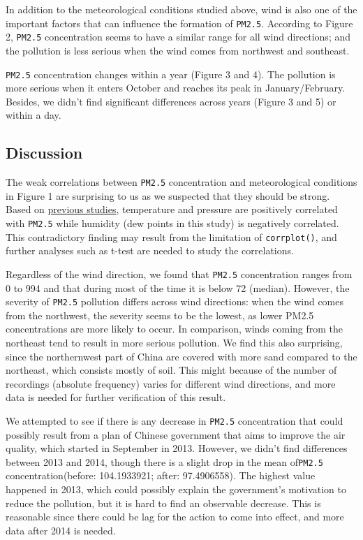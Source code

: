 \documentclass[]{article}
\begin{document}
In addition to the meteorological conditions studied above, wind is also
one of the important factors that can influence the formation of
\texttt{PM2.5}. According to Figure 2, \texttt{PM2.5} concentration
seems to have a similar range for all wind directions; and the pollution
is less serious when the wind comes from northwest and southeast.

\texttt{PM2.5} concentration changes within a year (Figure 3 and 4). The
pollution is more serious when it enters October and reaches its peak in
January/February. Besides, we didn't find significant differences across
years (Figure 3 and 5) or within a day.

\hypertarget{discussion}{%
\subsection{Discussion}\label{discussion}}

The weak correlations between \texttt{PM2.5} concentration and
meteorological conditions in Figure 1 are surprising to us as we
suspected that they should be strong. Based on
\href{https://www.atmos-chem-phys.net/18/5343/2018/acp-18-5343-2018.pdf}{previous
studies}, temperature and pressure are positively correlated with
\texttt{PM2.5} while humidity (dew points in this study) is negatively
correlated. This contradictory finding may result from the limitation of
\texttt{corrplot()}, and further analyses such as t-test are needed to
study the correlations.

Regardless of the wind direction, we found that \texttt{PM2.5}
concentration ranges from 0 to 994 and that during most of the time it
is below 72 (median). However, the severity of \texttt{PM2.5} pollution
differs across wind directions: when the wind comes from the northwest,
the severity seems to be the lowest, as lower PM2.5 concentrations are
more likely to occur. In comparison, winds coming from the northeast
tend to result in more serious pollution. We find this also surprising,
since the northernwest part of China are covered with more sand compared
to the northeast, which consists mostly of soil. This might because of
the number of recordings (absolute frequency) varies for different wind
directions, and more data is needed for further verification of this
result.

We attempted to see if there is any decrease in \texttt{PM2.5}
concentration that could possibly result from a plan of Chinese
government that aims to improve the air quality, which started in
September in 2013. However, we didn't find differences between 2013 and
2014, though there is a slight drop in the mean of\texttt{PM2.5}
concentration(before: 104.1933921; after: 97.4906558). The highest value
happened in 2013, which could possibly explain the government's
motivation to reduce the pollution, but it is hard to find an observable
decrease. This is reasonable since there could be lag for the action to
come into effect, and more data after 2014 is needed.
\end{document}
